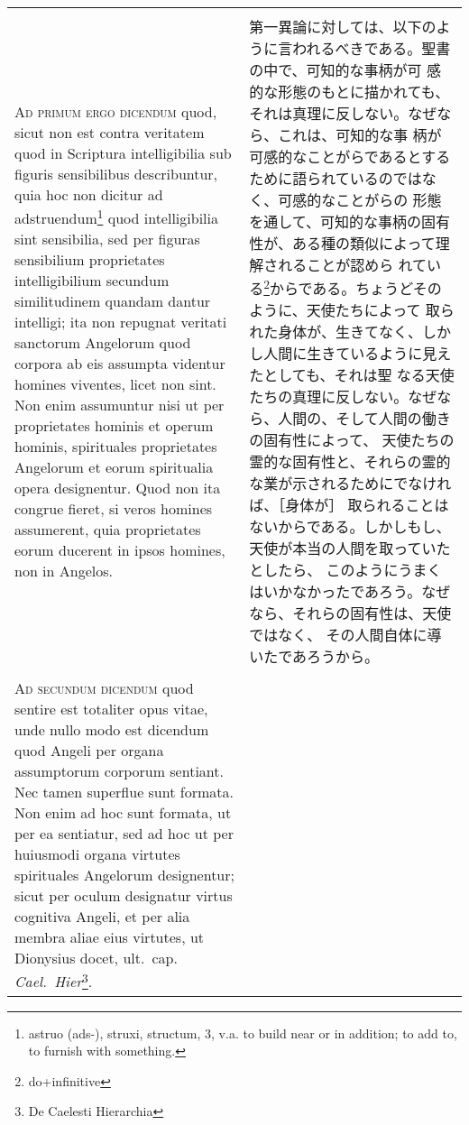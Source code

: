 \documentclass[10pt]{jsarticle} %
\begin{document}
\begin{longtable}{p{21em}p{21em}}
\\\\



{\scshape Ad primum ergo dicendum} quod, sicut non est contra veritatem quod in
Scriptura intelligibilia sub figuris sensibilibus describuntur, quia hoc non
dicitur ad adstruendum\footnote{astruo (ads-), struxi, structum, 3, v.a. to
build near or in addition; to add to, to furnish with something.} quod
intelligibilia sint sensibilia, sed per figuras sensibilium proprietates
intelligibilium secundum similitudinem quandam dantur intelligi; ita non
repugnat veritati sanctorum Angelorum quod corpora ab eis assumpta videntur
homines viventes, licet non sint. Non enim assumuntur nisi ut per proprietates
hominis et operum hominis, spirituales proprietates Angelorum et eorum
spiritualia opera designentur. Quod non ita congrue fieret, si veros homines
assumerent, quia proprietates eorum ducerent in ipsos homines, non in Angelos.

&

第一異論に対しては、以下のように言われるべきである。聖書の中で、可知的な事柄が可
感的な形態のもとに描かれても、それは真理に反しない。なぜなら、これは、可知的な事
柄が可感的なことがらであるとするために語られているのではなく、可感的なことがらの
形態を通して、可知的な事柄の固有性が、ある種の類似によって理解されることが認めら
れている\footnote{do+infinitive}からである。ちょうどそのように、天使たちによって
取られた身体が、生きてなく、しかし人間に生きているように見えたとしても、それは聖
なる天使たちの真理に反しない。なぜなら、人間の、そして人間の働きの固有性によって、
天使たちの霊的な固有性と、それらの霊的な業が示されるためにでなければ、［身体が］
取られることはないからである。しかしもし、天使が本当の人間を取っていたとしたら、
このようにうまくはいかなかったであろう。なぜなら、それらの固有性は、天使ではなく、
その人間自体に導いたであろうから。


\\\\


 {\scshape Ad secundum dicendum} quod sentire est totaliter opus vitae, unde
nullo modo est dicendum quod Angeli per organa assumptorum corporum
sentiant. Nec tamen superflue sunt formata. Non enim ad hoc sunt formata, ut per
ea sentiatur, sed ad hoc ut per huiusmodi organa virtutes spirituales Angelorum
designentur; sicut per oculum designatur virtus cognitiva Angeli, et per alia
membra aliae eius virtutes, ut Dionysius docet, ult.~cap.~{\itshape
Cael.~Hier}\footnote{De Caelesti Hierarchia}.


\end{longtable}
\end{document}
